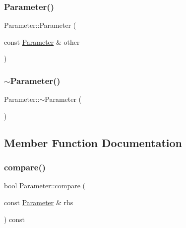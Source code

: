 \subsubsection{\texorpdfstring{Parameter()}{Parameter()}\hspace{0.1cm}{\footnotesize\ttfamily [3/3]}}
{\footnotesize\ttfamily Parameter\+::\+Parameter (\begin{DoxyParamCaption}\item[{const \mbox{\hyperlink{class_parameter}{Parameter}} \&}]{other }\end{DoxyParamCaption})}

\mbox{\label{class_parameter_a6e2ade42a712f1d3675653329266e42d}} 
\subsubsection{\texorpdfstring{$\sim$\+Parameter()}{~Parameter()}}
{\footnotesize\ttfamily Parameter\+::$\sim$\+Parameter (\begin{DoxyParamCaption}{ }\end{DoxyParamCaption})\hspace{0.3cm}{\ttfamily [virtual]}}



\subsection{Member Function Documentation}
\mbox{\label{class_parameter_adb0e139c6aeaedc4ee1e9432d464e9bc}} 
\subsubsection{\texorpdfstring{compare()}{compare()}}
{\footnotesize\ttfamily bool Parameter\+::compare (\begin{DoxyParamCaption}\item[{const \mbox{\hyperlink{class_parameter}{Parameter}} \&}]{rhs }\end{DoxyParamCaption}) const}

\mbox{\label{class_parameter_a8f0f2e92941e8bbae49de6388c87fdf8}} 

